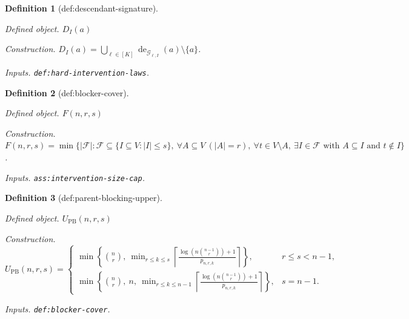 \documentclass{article}
\newtheorem{definition}{Definition}
\begin{document}
\begin{definition}[def:descendant-signature]\label{def:descendant-signature}
\par\smallskip\noindent\emph{Defined object.} \(D_I(a)\)
\par\smallskip\noindent\emph{Construction.} \(D_I(a)=\bigcup_{\ell\in[K]}\operatorname{de}_{\mathcal G_{\ell,I}}(a)\setminus\{a\}\).
\par\smallskip\noindent\emph{Inputs.} \texttt{def:\allowbreak{}hard-\allowbreak{}intervention-\allowbreak{}laws}.
\end{definition}

\begin{definition}[def:blocker-cover]\label{def:blocker-cover}
\par\smallskip\noindent\emph{Defined object.} \(F(n,r,s)\)
\par\smallskip\noindent\emph{Construction.} \(F(n,r,s)=\min\{|\mathcal F|:\mathcal F\subseteq\{I\subseteq V:|I|\le s\},\ \forall A\subseteq V\ (|A|=r),\ \forall t\in V\setminus A,\ \exists I\in\mathcal F\text{ with }A\subseteq I\text{ and }t\notin I\}\).
\par\smallskip\noindent\emph{Inputs.} \texttt{ass:\allowbreak{}intervention-\allowbreak{}size-\allowbreak{}cap}.
\end{definition}

\begin{definition}[def:parent-blocking-upper]\label{def:parent-blocking-upper}
\par\smallskip\noindent\emph{Defined object.} \(U_{\mathrm{PB}}(n,r,s)\)
\par\smallskip\noindent\emph{Construction.} \(U_{\mathrm{PB}}(n,r,s)=\begin{cases}\min\left\{\binom nr,\ \min_{r\le k\le s}\left\lceil\frac{\log\!\left(n\binom{n-1}{r}\right)+1}{p_{n,r,k}}\right\rceil\right\},&r\le s<n-1,\\ \min\left\{\binom nr,\ n,\ \min_{r\le k\le n-1}\left\lceil\frac{\log\!\left(n\binom{n-1}{r}\right)+1}{p_{n,r,k}}\right\rceil\right\},&s=n-1.\end{cases}\)
\par\smallskip\noindent\emph{Inputs.} \texttt{def:\allowbreak{}blocker-\allowbreak{}cover}.
\end{definition}
\end{document}
